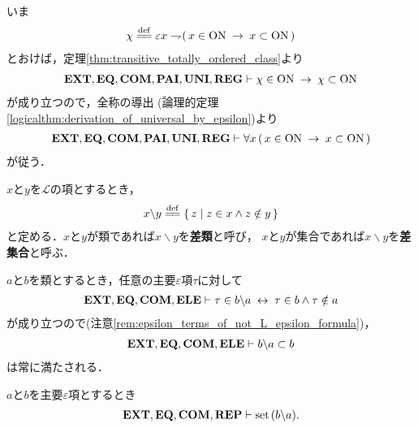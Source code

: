 	\begin{prf}
		いま
		\begin{align}
			\chi \defeq \varepsilon x \negation 
			(\, x \in \ON \rarrow x \subset \ON\, )
		\end{align}
		とおけば，定理\ref{thm:transitive_totally_ordered_class}より
		\begin{align}
			\mbox{{\bf EXT}},\mbox{{\bf EQ}},\mbox{\bf COM},\mbox{{\bf PAI}},\mbox{{\bf UNI}},\mbox{{\bf REG}} \vdash 
			\chi \in \mathrm{ON} \hspace{0.25em}\rightarrow\hspace{0.25em} \chi \subset \mathrm{ON}
		\end{align}
		が成り立つので，全称の導出
		(論理的定理\ref{logicalthm:derivation_of_universal_by_epsilon})より
		\begin{align}
			\mbox{{\bf EXT}},\mbox{{\bf EQ}},\mbox{\bf COM},\mbox{{\bf PAI}},\mbox{{\bf UNI}},\mbox{{\bf REG}} \vdash 
			\forall x\, (\, x \in \mathrm{ON} \hspace{0.25em}\rightarrow\hspace{0.25em} x \subset \mathrm{ON}\, )
		\end{align}
		が従う．
		\QED
	\end{prf}
	
	\begin{screen}
		\begin{dfn}[類の差]
			$x$と$y$を$\mathcal{L}$の項とするとき，
			\begin{align}
				x \backslash y \defeq \Set{z}{z \in x \wedge z \notin y}
			\end{align}
			と定める．$x$と$y$が類であれば$x \backslash y$を{\bf 差類}と呼び，
			$x$と$y$が集合であれば$x \backslash y$を{\bf 差集合}と呼ぶ．
		\end{dfn}
	\end{screen}
	
	$a$と$b$を類とするとき，任意の主要$\varepsilon$項$\tau$に対して
	\begin{align}
		\mbox{{\bf EXT}},\mbox{{\bf EQ}},\mbox{\bf COM},\mbox{{\bf ELE}} \vdash \tau \in b \backslash a \hspace{0.25em}\leftrightarrow\hspace{0.25em} \tau \in b \wedge \tau \notin a
	\end{align}
	が成り立つので(注意\ref{rem:epsilon_terms_of_not_L_epsilon_formula})，
	\begin{align}
		\mbox{{\bf EXT}},\mbox{{\bf EQ}},\mbox{\bf COM},\mbox{{\bf ELE}} \vdash b \backslash a \subset b
	\end{align}
	は常に満たされる．
	
	\begin{screen}
		\begin{thm}[差集合は集合]\label{thm:set_difference_is_set}
			$a$と$b$を主要$\varepsilon$項とするとき
			\begin{align}
				\mbox{{\bf EXT}},\mbox{{\bf EQ}},\mbox{\bf COM},\mbox{{\bf REP}} \vdash \operatorname*{set}\hspace{0.15em}(b \backslash a).
			\end{align}
		\end{thm}
	\end{screen}
	
